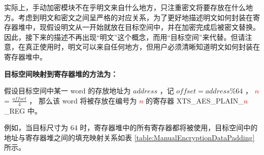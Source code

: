 \documentclass[main\_\_CN.tex]{subfiles}
\begin{document}
实际上，手动加密模块不在乎明文来自什么地方，只注重密文将要存放在什么地方。考虑到明文和密文之间呈严格的对应关系，为了更好地描述明文如何封装在寄存器堆中，现假设明文从一开始就放在目标空间中，并在加密完成后被密文替换。因此，接下来的描述不再出现“明文”这个概念，而用“目标空间”来代替。但请注意，在真正使用时，明文可以来自任何地方，但用户必须清晰知道明文如何封装在寄存器堆中。

{\bfseries 目标空间映射到寄存器堆的方法为：}

假设目标空间中某一 word 的存放地址为 \begin{math} address \end{math} ，记  \begin{math} offset = address \% 64 \end{math} ，
    \textcolor{red}{\it{$n$}} =  \begin{math} \frac{offset}{4} \end{math} ，
    那么该 word 将被存放在编号为 \textcolor{red}{\it{$n$}} 的寄存器  XTS\_AES\_PLAIN\_\textcolor{red}{\it{$n$}}\_REG 中。

例如，当目标尺寸为 64 时，寄存器堆中的所有寄存器都将被使用，目标空间中的地址与寄存器堆之间的填充映射关系如表 \ref{table:ManualEncryptionDataPadding} 所示。
\end{document}
